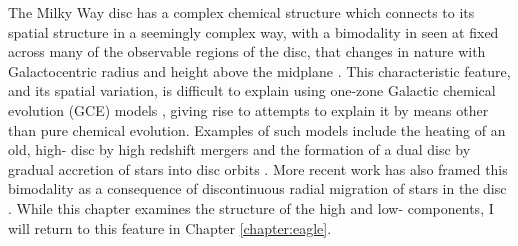 
The Milky Way disc has a complex chemical structure which connects to its spatial structure in a seemingly complex way, with a bimodality in \afe{} seen at fixed \feh{} across many of the observable regions of the disc, that changes in nature with Galactocentric radius and height above the midplane \citep{2003A&A...410..527B,2005A&A...433..185B,2014ApJ...796...38N,2015ApJ...808..132H}. This characteristic feature, and its spatial variation, is difficult to explain using one-zone Galactic chemical evolution (GCE) models \citep[most recently shown by][]{2016arXiv160408613A}, giving rise to attempts to explain it by means other than pure chemical evolution. Examples of such models include the heating of an old, high-\afe{} disc by high redshift mergers \citep[e.g.][]{2004ApJ...612..894B,2008MNRAS.391.1806V,2009ApJ...700.1896K,2013A&A...558A...9M} and the formation of a dual disc by gradual accretion of stars into disc orbits \citep[e.g.][]{2003ApJ...597...21A}. More recent work has also framed this bimodality as a consequence of discontinuous radial migration of stars in the disc \citep{2016arXiv161009869T}. While this chapter examines the structure of the high and low-\afe{} components, I will return to this feature in Chapter \ref{chapter:eagle}.

